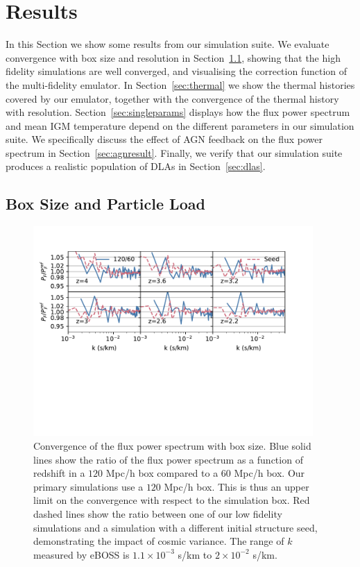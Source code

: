 \documentclass[a4paper,11pt]{article}
\begin{document}
\section{Results}

In this Section we show some results from our simulation suite. We evaluate convergence with box size and resolution in Section~\ref{sec:boxsize}, showing that the high fidelity simulations are well converged, and visualising the correction function of the multi-fidelity emulator. In Section~\ref{sec:thermal} we show the thermal histories covered by our emulator, together with the convergence of the thermal history with resolution. Section~\ref{sec:singleparams} displays how the flux power spectrum and mean IGM temperature depend on the different parameters in our simulation suite. We specifically discuss the effect of AGN feedback on the flux power spectrum in Section~\ref{sec:agnresult}. Finally, we verify that our simulation suite produces a realistic population of DLAs in Section~\ref{sec:dlas}.

\subsection{Box Size and Particle Load}
\label{sec:boxsize}

\begin{figure}
\includegraphics[width=0.95\textwidth,trim={0 4.5cm 1cm 0},clip]{figures/box-convergence.pdf}
 \caption{Convergence of the flux power spectrum with box size. Blue solid lines show the ratio of the flux power spectrum as a function of redshift in a $120$ Mpc/h box compared to a $60$ Mpc/h box. Our primary simulations use a $120$ Mpc/h box. This is thus an upper limit on the convergence with respect to the simulation box. Red dashed lines show the ratio between one of our low fidelity simulations and a simulation with a different initial structure seed, demonstrating the impact of cosmic variance. The range of $k$ measured by eBOSS is $1.1 \times 10^{-3}$ s/km to $2\times 10^{-2}$ s/km.}
 \label{fig:boxsize}
\end{figure}
\end{document}
